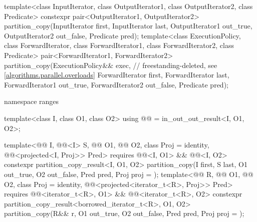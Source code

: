 \begin{codeblock}
{  template<class InputIterator, class OutputIterator1,
           class OutputIterator2, class Predicate>
    constexpr pair<OutputIterator1, OutputIterator2>
      partition_copy(InputIterator first, InputIterator last,
                     OutputIterator1 out_true, OutputIterator2 out_false,
                     Predicate pred);
  template<class ExecutionPolicy, class ForwardIterator, class ForwardIterator1,
           class ForwardIterator2, class Predicate>
    pair<ForwardIterator1, ForwardIterator2>
      partition_copy(ExecutionPolicy&& exec,                    // freestanding-deleted, see \ref{algorithms.parallel.overloads}
                     ForwardIterator first, ForwardIterator last,
                     ForwardIterator1 out_true, ForwardIterator2 out_false,
                     Predicate pred);

  namespace ranges {
    template<class I, class O1, class O2>
      using @@ = in_out_out_result<I, O1, O2>;

    template<@@ I, @@<I> S,
             @@ O1, @@ O2,
             class Proj = identity, @@<projected<I, Proj>> Pred>
      requires @@<I, O1> && @@<I, O2>
      constexpr partition_copy_result<I, O1, O2>
        partition_copy(I first, S last, O1 out_true, O2 out_false, Pred pred,
                       Proj proj = {});
    template<@@ R, @@ O1, @@ O2,
             class Proj = identity,
             @@<projected<iterator_t<R>, Proj>> Pred>
      requires @@<iterator_t<R>, O1> &&
               @@<iterator_t<R>, O2>
      constexpr partition_copy_result<borrowed_iterator_t<R>, O1, O2>
        partition_copy(R&& r, O1 out_true, O2 out_false, Pred pred, Proj proj = {});

}}
\end{codeblock}
